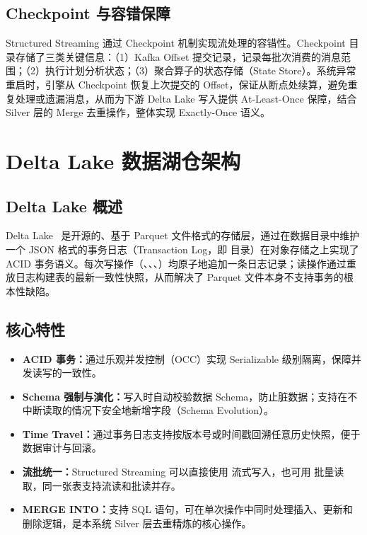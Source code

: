 \subsection{Checkpoint 与容错保障}

Structured Streaming 通过 Checkpoint 机制实现流处理的容错性。Checkpoint 目录存储了三类关键信息：（1）Kafka Offset 提交记录，记录每批次消费的消息范围；（2）执行计划分析状态；（3）聚合算子的状态存储（State Store）。系统异常重启时，引擎从 Checkpoint 恢复上次提交的 Offset，保证从断点处续算，避免重复处理或遗漏消息，从而为下游 Delta Lake 写入提供 At-Least-Once 保障，结合 Silver 层的 Merge 去重操作，整体实现 Exactly-Once 语义。

\section{Delta Lake 数据湖仓架构}

\subsection{Delta Lake 概述}

Delta Lake~\cite{armbrust2020delta} 是开源的、基于 Parquet 文件格式的存储层，通过在数据目录中维护一个 JSON 格式的事务日志（Transaction Log，即  目录）在对象存储之上实现了 ACID 事务语义。每次写操作（、、、）均原子地追加一条日志记录；读操作通过重放日志构建表的最新一致性快照，从而解决了 Parquet 文件本身不支持事务的根本性缺陷。

\subsection{核心特性}

\begin{itemize}
  \item \textbf{ACID 事务：}通过乐观并发控制（OCC）实现 Serializable 级别隔离，保障并发读写的一致性。
  \item \textbf{Schema 强制与演化：}写入时自动校验数据 Schema，防止脏数据；支持在不中断读取的情况下安全地新增字段（Schema Evolution）。
  \item \textbf{Time Travel：}通过事务日志支持按版本号或时间戳回溯任意历史快照，便于数据审计与回滚。
  \item \textbf{流批统一：}Structured Streaming 可以直接使用  流式写入，也可用  批量读取，同一张表支持流读和批读并存。
  \item \textbf{MERGE INTO：}支持 SQL  语句，可在单次操作中同时处理插入、更新和删除逻辑，是本系统 Silver 层去重精炼的核心操作。
\end{itemize}

